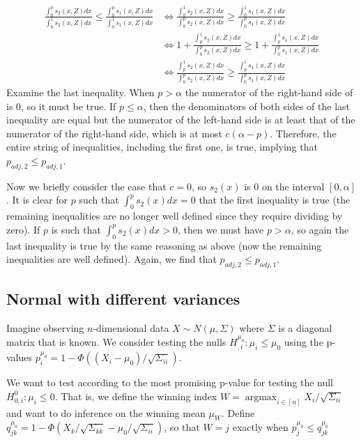 \documentclass{article}
\DeclareMathOperator*{\argmax}{argmax}
\begin{document}
\begin{appendix}
\begin{align*}
    \frac{\int_0^p s_2(x, Z) dx }{\int_0^1 s_2(x, Z) dx}  \leq \frac{\int_0^p s_1(x, Z) dx }{\int_0^1 s_1(x, Z) dx} &\iff  \frac{\int_0^1 s_2(x, Z) dx}  {\int_0^p s_2(x, Z) dx }\geq \frac{\int_0^1 s_1(x, Z) dx}{\int_0^p s_1(x, Z) dx }\\
    &\iff 1 + \frac{\int_p^1 s_2(x, Z) dx}  {\int_0^p s_2(x, Z) dx }\geq 1 + \frac{\int_p^1 s_1(x, Z) dx}{\int_0^p s_1(x, Z) dx }\\
    &\iff \frac{\int_p^1 s_2(x, Z) dx}  {\int_0^p s_2(x, Z) dx }\geq \frac{\int_p^1 s_1(x, Z) dx}{\int_0^p s_1(x, Z) dx }
\end{align*}
Examine the last inequality. When $p > \alpha$ the numerator of the right-hand side of is $0$, so it must be true. If $p \leq \alpha$, then the denominators of both sides of the last inequality are equal but the numerator of the left-hand side is at least that of the numerator of the right-hand side, which is at most $c(\alpha - p)$. Therefore, the entire string of inequalities, including the first one, is true, implying that $p_{adj, 2} \leq p_{adj, 1}$. 

Now we briefly consider the case that $c=0$, so $s_2(x)$ is $0$ on the interval $[0, \alpha]$. It is clear for $p$ such that $\int_0^p s_2(x)dx = 0$ that the first inequality is true (the remaining inequalities are no longer well defined since they require dividing by zero). If $p$ is such that  $\int_0^p s_2(x)dx > 0$, then we must have $p > \alpha$, so again the last inequality is true by the same reasoning as above (now the remaining inequalities are well defined). Again, we find that $p_{adj, 2} \leq p_{adj, 1}$.
 

\subsection{Normal with different variances}

Imagine observing $n$-dimensional data $X \sim N(\mu, \Sigma)$ where $\Sigma$ is a diagonal matrix that is known. We consider testing the nulls $H_{, i}^{\mu_0}: \mu_i \leq \mu_0 $ using the p-values $p^{\mu_0}_i = 1 - \Phi((X_i - \mu_0)/\sqrt{\Sigma_{ii}})$. 

We want to test according to the most promising p-value for testing the null $H_{0, i}^{0}: \mu_i \leq 0 $. That is, we define the winning index $W = \argmax_{i \in [n]} X_i/ \sqrt{\Sigma_{ii}}$ and want to do inference on the winning mean $\mu_W$. Define $q^{\mu_0}_{jk} = 1 - \Phi(X_k/\sqrt{\Sigma_{kk}} - \mu_0/\sqrt{\Sigma_{ii}} )$, so that $W = j$ exactly when $p^{\mu_0}_j \leq q^{\mu_0}_{jk}$ 




\end{appendix}
\end{document}
